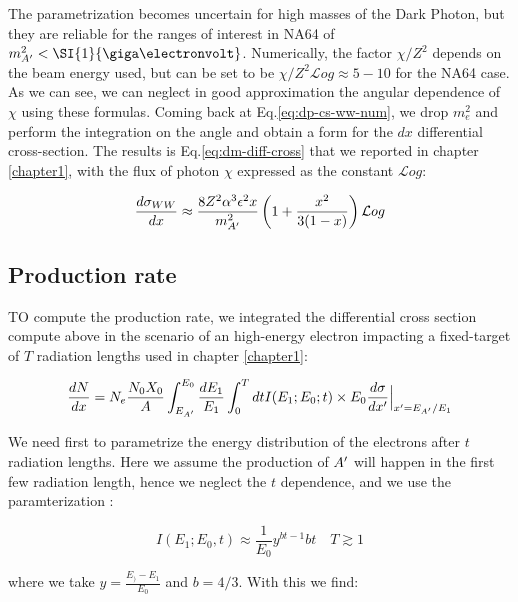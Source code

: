  The parametrization becomes uncertain for high masses of the Dark Photon, but they are reliable for the ranges of interest in NA64 of $m^2_{\DM} < \SI{1}{\giga\electronvolt}$. Numerically, the factor $\chi / Z^2$ depends on the beam energy used, but can be set to be $\chi/Z^2 \mathcal{L}og \approx 5-10$ for the NA64 case. As we can see, we can neglect in good approximation the angular dependence of $\chi$ using these formulas. Coming back at Eq.\ref{eq:dp-cs-ww-num}, we drop $m^2_e$ and perform the integration on the angle and obtain a form for the $dx$ differential cross-section. The results is Eq.\ref{eq:dm-diff-cross} that we reported in chapter \ref{chapter1}, with the flux of photon $\chi$ expressed as the constant $\mathcal{L}og$:

 \begin{equation}
   \label{eq:dp-cs-dx}
\frac{d\sigma_{WW}}{dx} \approx \frac{8 Z^2 \alpha^3 \epsilon^2 x}{m^2_{A'}} \left( 1 + \frac{x^2}{3(1-x)} \right) \mathcal{L}og    
\end{equation}


\subsection{Production rate}
\label{appA:sec:production-rate}

TO compute the production rate, we integrated the differential cross section compute above in the scenario of an high-energy electron impacting a fixed-target of $T$ radiation lengths used in chapter \ref{chapter1}:


\begin{equation}
  \label{eq:dm-gy}
  \frac{dN}{dx} = N_e \frac{N_0 X_0}{A} \int_{E_{A'}}^{E_0} \frac{dE_1}{E_1} \int_0^T dt I(E_1;E_0;t) \times E_0 \frac{d\sigma}{dx'}\Big|_{x' = E_{A'}/E_1}
\end{equation}

We need first to parametrize the energy distribution of the electrons after $t$ radiation lengths. Here we assume the production of $A'$ will happen in the first few radiation length, hence we neglect the $t$ dependence, and we use the paramterization \cite{jdb}:

\begin{equation}
  \label{eq:i-dist}
  I(E_1;E_0,t) \approx  \frac{1}{E_0} y^{bt-1} bt \quad T \gtrsim 1
\end{equation}

where we take $y = \frac{E_) - E_1}{E_0}$ and $b=4/3$. With this we find:

